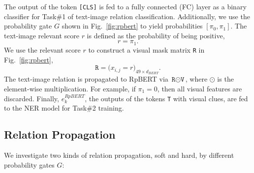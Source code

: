 \documentclass[letterpaper]{article} \usepackage{aaai21}  \usepackage{times}  \usepackage{helvet} \usepackage{courier}  \usepackage[hyphens]{url}  \usepackage{graphicx} \urlstyle{rm} \def\UrlFont{\rm}  \usepackage{natbib}  \usepackage{caption} \frenchspacing  \setlength{\pdfpagewidth}{8.5in}  \setlength{\pdfpageheight}{11in}
\begin{document}
The output of the token \texttt{[CLS]} is fed to a fully connected (FC) layer as a binary classifier for Task\#1 of text-image relation classification.
Additionally, we use the probability gate $G$ shown in Fig.~\ref{fig:rpbert} to yield probabilities $[\pi_0,\pi_1]$.
The text-image relevant score $r$ is defined as the probability of being positive,
\begin{equation}
\label{eq:score}
r=\pi_1.
\end{equation} 
We use the relevant score $r$ to construct a visual mask matrix \texttt{R} in Fig.~\ref{fig:rpbert},
\begin{equation}
\label{eq:R}
\texttt{R}= \Big (
	x_{i,j}=r
\Big ) _{49 \times d_{BERT}}.
\end{equation} 
The text-image relation is propagated to  RpBERT via $\texttt{R} \odot \texttt{V}$, where $\odot$ is the element-wise multiplication.
For example, if $\pi_1=0$, then all visual features are discarded.
Finally,  $e^{RpBERT}_k$, the outputs of the tokens \texttt{T} with visual clues, are fed to the NER model  for Task\#2 training.













\subsection{Relation Propagation}

We investigate two kinds of relation propagation, soft and hard, by different probability gates $G$:
\end{document}
